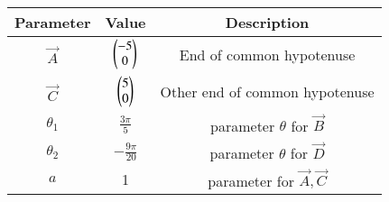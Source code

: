 
\begin{tabular}[]{|c|c|c|}
\hline
Parameter	& Value	& Description \\ \hline
$\vec{A}$	& $\begin{pmatrix}-5\\0\end{pmatrix}$ & End of common hypotenuse \\ \hline
$\vec{C}$	& $\begin{pmatrix}5\\0\end{pmatrix}$ & Other end of common hypotenuse\\[1pt] \hline
$\theta_1$		& $ \frac{3\pi}{5} $ & parameter $\theta$ for $\vec{B}$ \\[1pt] \hline
$\theta_2$ 		& $ -\frac{9 \pi}{20}$ & parameter $\theta$ for $\vec{D}$\\ \hline
$a$	& 1 	& parameter for $\vec{A},\vec{C}$ \\ \hline
\end{tabular}
